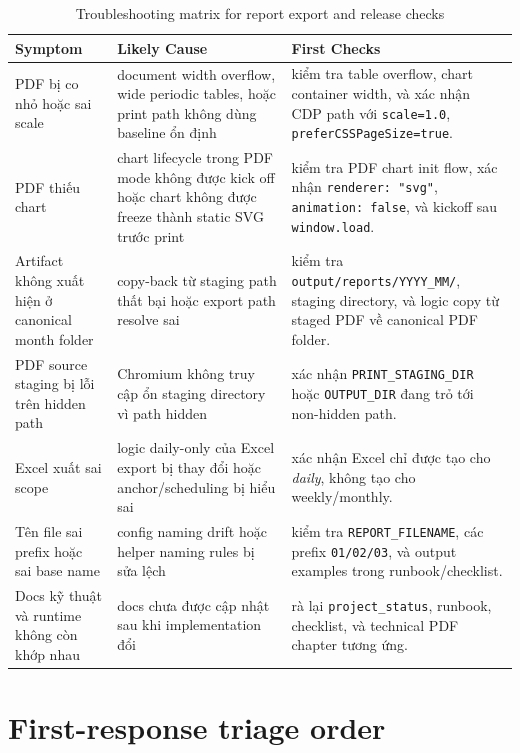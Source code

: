 \begin{table}[htbp]
	\centering
	\renewcommand{\arraystretch}{1.3}
	\caption{Troubleshooting matrix for report export and release checks}
	\label{tab:troubleshooting_matrix}
	\begin{tabularx}{\linewidth}{|>{\RaggedRight\arraybackslash}p{3.3cm}|>{\RaggedRight\arraybackslash}X|>{\RaggedRight\arraybackslash}X|}
		\hline
		\textbf{Symptom} & \textbf{Likely Cause} & \textbf{First Checks} \\ \hline
		PDF bị co nhỏ hoặc sai scale & document width overflow, wide periodic tables, hoặc print path không dùng baseline ổn định & kiểm tra table overflow, chart container width, và xác nhận CDP path với \texttt{scale=1.0}, \texttt{preferCSSPageSize=true}. \\ \hline
		PDF thiếu chart & chart lifecycle trong PDF mode không được kick off hoặc chart không được freeze thành static SVG trước print & kiểm tra PDF chart init flow, xác nhận \texttt{renderer: "svg"}, \texttt{animation: false}, và kickoff sau \texttt{window.load}. \\ \hline
		Artifact không xuất hiện ở canonical month folder & copy-back từ staging path thất bại hoặc export path resolve sai & kiểm tra \texttt{output/reports/YYYY\_MM/}, staging directory, và logic copy từ staged PDF về canonical PDF folder. \\ \hline
		PDF source staging bị lỗi trên hidden path & Chromium không truy cập ổn staging directory vì path hidden & xác nhận \texttt{PRINT\_STAGING\_DIR} hoặc \texttt{OUTPUT\_DIR} đang trỏ tới non-hidden path. \\ \hline
		Excel xuất sai scope & logic daily-only của Excel export bị thay đổi hoặc anchor/scheduling bị hiểu sai & xác nhận Excel chỉ được tạo cho \textit{daily}, không tạo cho weekly/monthly. \\ \hline
		Tên file sai prefix hoặc sai base name & config naming drift hoặc helper naming rules bị sửa lệch & kiểm tra \texttt{REPORT\_FILENAME}, các prefix \texttt{01/02/03}, và output examples trong runbook/checklist. \\ \hline
		Docs kỹ thuật và runtime không còn khớp nhau & docs chưa được cập nhật sau khi implementation đổi & rà lại \texttt{project\_status}, runbook, checklist, và technical PDF chapter tương ứng. \\ \hline
	\end{tabularx}
\end{table}

\section{First-response triage order}

